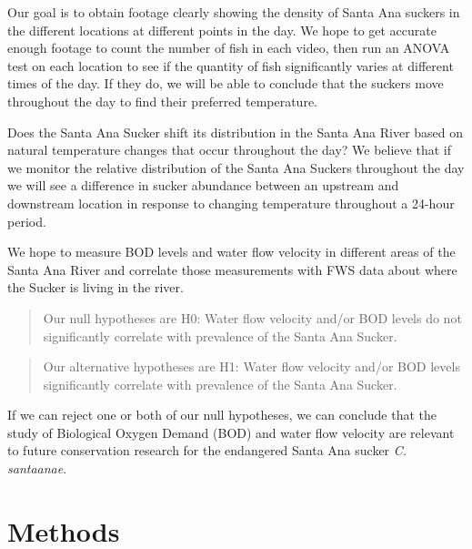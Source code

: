 \documentclass{article}\usepackage[]{graphicx}\usepackage[]{color}
\begin{document}
Our goal is to obtain footage clearly showing the density of Santa Ana suckers in the different locations at different points in the day.  We hope to get accurate enough footage to count the number of fish in each video, then run an ANOVA test on each location to see if the quantity of fish significantly varies at different times of the day.  If they do, we will be able to conclude that the suckers move throughout the day to find their preferred temperature.

Does the Santa Ana Sucker shift its distribution in the Santa Ana River based on natural temperature changes that occur throughout the day? We believe that if we monitor the relative distribution of the Santa Ana Suckers throughout the day we will see a difference in sucker abundance between an upstream and downstream location in response to changing temperature throughout a 24-hour period.

We hope to measure BOD levels and water flow velocity in different areas of the Santa Ana River and correlate those measurements with FWS data about where the Sucker is living in the river.
\begin{quote}
Our null hypotheses are H0: Water flow velocity and/or BOD levels do not significantly correlate with prevalence of the Santa Ana Sucker.
\end{quote}
\begin{quote}
Our alternative hypotheses are H1: Water flow velocity and/or BOD levels significantly correlate with prevalence of the Santa Ana Sucker.
\end{quote}
If we can reject one or both of our null hypotheses, we can conclude that the study of Biological Oxygen Demand (BOD) and water flow velocity are relevant to future conservation research for the endangered Santa Ana sucker \emph{C. santaanae}.


\section{Methods}
\end{document}

